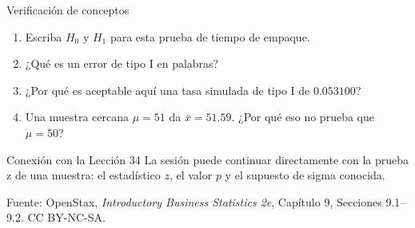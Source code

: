 \documentclass[aspectratio=169,10pt,spanish]{beamer}
\begin{document}
\begin{frame}{Verificación de conceptos}
  \begin{enumerate}
    \item Escriba $H_{0}$ y $H_{1}$ para esta prueba de tiempo de empaque.
    \item ¿Qué es un error de tipo I en palabras?
    \item ¿Por qué es aceptable aquí una tasa simulada de tipo I de $0.053100$?
    \item Una muestra cercana $\mu=51$ da $\bar{x}=51.59$. ¿Por qué eso no
      prueba que $\mu=50$?
  \end{enumerate}

  \vspace{0.6em}
  \begin{block}{Conexión con la Lección 34}
    La sesión puede continuar directamente con la prueba z de una muestra: el
    estadístico $z$, el valor $p$ y el supuesto de sigma conocida.
  \end{block}

  \vfill
  \scriptsize Fuente: OpenStax, \textit{Introductory Business Statistics 2e},
  Capítulo 9, Secciones 9.1--9.2. CC BY-NC-SA.
\end{frame}

\appendix
\end{document}
